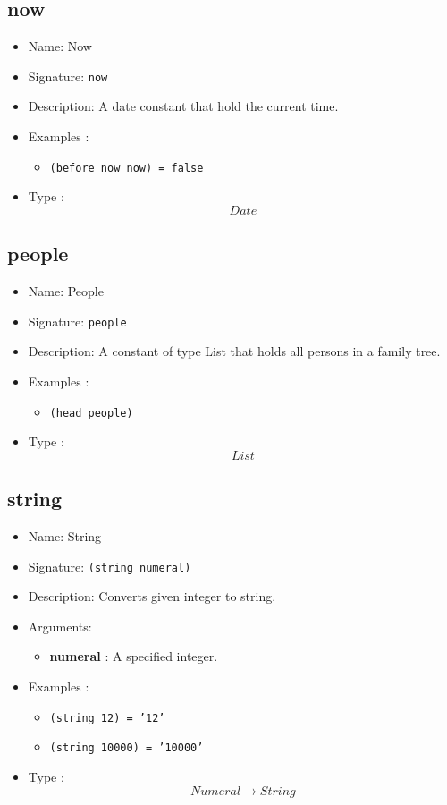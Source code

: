 \subsection{now}
\begin{itemize}
    \item Name: Now
    \item Signature: \texttt{now}
    \item Description: A date constant that hold the current time.
    \item Examples :
        \begin{itemize}
            \item \texttt{(before now now) = false}
        \end{itemize}
    \item Type : \[Date\]
\end{itemize}

\subsection{people}
\begin{itemize}
    \item Name: People
    \item Signature: \texttt{people}
    \item Description: A constant of type List that holds all persons in a family tree.
    \item Examples :
        \begin{itemize}
            \item \texttt{(head people)}
        \end{itemize}
    \item Type : \[List\]
\end{itemize}

\subsection{string}
\begin{itemize}
    \item Name: String
    \item Signature: \texttt{(string numeral)}
    \item Description: Converts given integer to string.
    \item Arguments:
        \begin{itemize}
            \item \textbf{numeral} : A specified integer.
        \end{itemize}
    \item Examples :
        \begin{itemize}
            \item \texttt{(string 12) = '12'}
            \item \texttt{(string 10000) = '10000'}
        \end{itemize}
    \item Type : \[Numeral \to String\]
\end{itemize}

